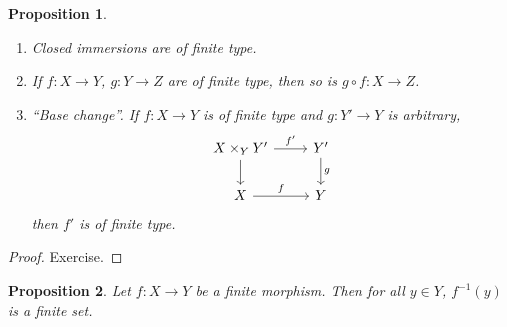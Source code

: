 \documentclass[12pt]{article}
\newtheorem*{proposition}{Proposition}
\theoremstyle{definition}
\theoremstyle{remark}
\begin{document}
\begin{proposition}
\begin{enumerate}[label=\arabic*)]
\item Closed immersions are of finite type.

\item If $f:X\rightarrow Y$, $g:Y\rightarrow Z$ are of finite type, then so is $g\circ f:X\rightarrow Z$.

\item ``Base change''. If $f:X\rightarrow Y$ is of finite type and $g:Y'\rightarrow Y$ is arbitrary,
\[
\begin{tikzcd}
X\times_YY'\arrow[r,"f'"]\arrow[d]&Y'\arrow[d,"g"]\\
X\arrow[r,"f"]&Y
\end{tikzcd}
\]
then $f'$ is of finite type.
\end{enumerate}
\end{proposition}

\begin{proof}
Exercise.
\end{proof}

\begin{proposition}
Let $f:X\rightarrow Y$ be a finite morphism. Then for all $y\in Y$, $f^{-1}(y)$ is a finite set.
\end{proposition}
\end{document}
